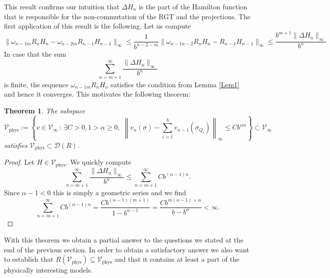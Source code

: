 \documentclass{article}
\newtheorem{theorem}{Theorem}[section]
\begin{document}
This result confirms our intuition that $\Delta H_n$ is the part of the Hamilton function that is responsible for the non-commutation of the RGT and the projections. The first application of this result is the following. Let us compute
\begin{equation}
    \|\omega_{n-1m}R_nH_n-\omega_{n-2m}R_{n-1}H_{n-1}\|_\infty\leq\frac{1}{b^{n-2-m}}\|\omega_{n-1n-2}R_nH_n-R_{n-1}H_{n-1}\|_\infty\leq\frac{b^{m+1}\|\Delta H_n\|_\infty}{b^{n}}
\end{equation}
In case that the sum
\begin{equation}
    \sum_{n=m+1}^\infty\frac{\|\Delta H_n\|_\infty}{b^n}
\end{equation}
is finite, the sequence $\omega_{n-1m}R_nH_n$ satisfies the condition from Lemma \ref{Lem1} and hence it converges. This motivates the following theorem:

\begin{theorem}\label{Thm1}
    The subspace
    \begin{equation}
        \mathcal{V}_\mathrm{phys}:=\left\{v\in \mathcal{V}_\infty\,:\,\exists C>0,1>\alpha\geq0,\,\,\left\|v_n(\sigma)-\sum_{i=1}^bv_{n-1}(\sigma_{Q_i})\right\|_\infty\leq Cb^{\alpha n}\right\}\subset \mathcal{V}_\infty
    \end{equation}
    satisfies $\mathcal{V}_\mathrm{phys}\subset\mathscr{D}(R)$.
\end{theorem}

\begin{proof}
    Let $H\in \mathcal{V}_\mathrm{phys}$. We quickly compute
    \begin{equation}
        \sum_{n=m+1}^\infty\frac{\|\Delta H_n\|_\infty}{b^n}\leq\sum_{n=m+1}^\infty Cb^{(\alpha-1)n}.
    \end{equation}
    Since $\alpha-1<0$ this is simply a geometric series and we find
    \begin{equation}
        \sum_{n=m+1}^\infty Cb^{(\alpha-1)n}=\frac{Cb^{(\alpha-1)(m+1)}}{1-b^{\alpha-1}}=\frac{Cb^{m(\alpha-1)+\alpha}}{b-b^\alpha}<\infty.
    \end{equation}
\end{proof}

With this theorem we obtain a partial answer to the questions we stated at the end of the previous section. In order to obtain a satisfactory answer we also want to establish that $R(\mathcal{V}_\mathrm{phys})\subseteq \mathcal{V}_\mathrm{phys}$ and that it contains at least a part of the physically interesting models.
\end{document}

